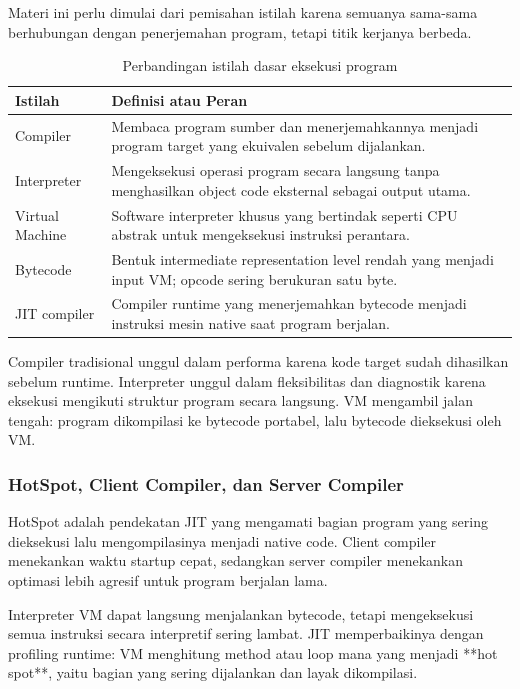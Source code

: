 Materi ini perlu dimulai dari pemisahan istilah karena semuanya sama-sama berhubungan dengan penerjemahan program, tetapi titik kerjanya berbeda.

\begin{table}[H]
\centering
\begin{tabularx}{\textwidth}{|L{0.22\textwidth}|X|}
\hline
\textbf{Istilah} & \textbf{Definisi atau Peran} \\
\hline
Compiler & Membaca program sumber dan menerjemahkannya menjadi program target yang ekuivalen sebelum dijalankan. \\
\hline
Interpreter & Mengeksekusi operasi program secara langsung tanpa menghasilkan object code eksternal sebagai output utama. \\
\hline
Virtual Machine & Software interpreter khusus yang bertindak seperti CPU abstrak untuk mengeksekusi instruksi perantara. \\
\hline
Bytecode & Bentuk intermediate representation level rendah yang menjadi input VM; opcode sering berukuran satu byte. \\
\hline
JIT compiler & Compiler runtime yang menerjemahkan bytecode menjadi instruksi mesin native saat program berjalan. \\
\hline
\end{tabularx}
\caption{Perbandingan istilah dasar eksekusi program}
\label{tab:istilah-interpreter-vm}
\end{table}

Compiler tradisional unggul dalam performa karena kode target sudah dihasilkan sebelum runtime. Interpreter unggul dalam fleksibilitas dan diagnostik karena eksekusi mengikuti struktur program secara langsung. VM mengambil jalan tengah: program dikompilasi ke bytecode portabel, lalu bytecode dieksekusi oleh VM.

\subsubsection{HotSpot, Client Compiler, dan Server Compiler}

\begin{jawab}
HotSpot adalah pendekatan JIT yang mengamati bagian program yang sering dieksekusi lalu mengompilasinya menjadi native code. Client compiler menekankan waktu startup cepat, sedangkan server compiler menekankan optimasi lebih agresif untuk program berjalan lama.
\end{jawab}

Interpreter VM dapat langsung menjalankan bytecode, tetapi mengeksekusi semua instruksi secara interpretif sering lambat. JIT memperbaikinya dengan profiling runtime: VM menghitung method atau loop mana yang menjadi **hot spot**, yaitu bagian yang sering dijalankan dan layak dikompilasi.

